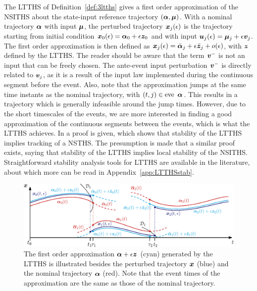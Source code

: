\documentclass[../DC2017114Bouma.tex]{subfiles}
\begin{document}
The LTTHS of Definition~\ref{def:3ltths} gives a first order approximation of the NSITHS about the state-input reference trajectory $(\boldsymbol{\alpha},\boldsymbol{\mu})$. With a nominal trajectory $\boldsymbol{\alpha}$ with input $\boldsymbol{\mu}$, the perturbed trajectory ${\boldsymbol{x}}_j(\epsilon)$ is the trajectory starting from initial condition ${\boldsymbol{x}}_0(\epsilon) = \boldsymbol{\alpha}_0 + \epsilon{\boldsymbol{z}}_0$ and with input ${\boldsymbol{u}}_j(\epsilon) = \boldsymbol{\mu}_j + \epsilon{\boldsymbol{v}}_j$. The first order approximation is then defined as ${\boldsymbol{x}}_j(\epsilon) = \bar{\boldsymbol{\alpha}}_j + \epsilon\bar{{\boldsymbol{z}}}_j + o(\epsilon)$, with ${\boldsymbol{z}}$ defined by the LTTHS. The reader should be aware that the term ${\boldsymbol{v}}^-$ is not an input that can be freely chosen. The ante-event input perturbation ${\boldsymbol{v}}^-$ is directly related to ${\boldsymbol{v}}_j$, as it is a result of the input law implemented during the continuous segment before the event. Also, note that the approximation jumps at the same time instants as the nominal trajectory, with $(t,j) \in \eve\ \alphab$. This results in a trajectory which is generally infeasible around the jump times. However, due to the short timescales of the events, we are more interested in finding a good approximation of the continuous segments between the events, which is what the LTTHS achieves. In \cite{Rijnen2017} a proof is given, which shows that stability of the LTTHS implies tracking of a NSTHS. The presumption is made that a similar proof exists, saying that stability of the LTTHS implies local stability of the NSITHS. Straightforward stability analysis tools for LTTHS are available in the literature, about which more can be read in Appendix~\ref{app:LTTHSstab}.
%
\begin{figure}[h]
\centering
\includegraphics[width=\textwidth]{refspreadapprox.eps}\caption{The first order approximation $\boldsymbol{\alpha} + \epsilon{\boldsymbol{z}}$ (cyan) generated by the LTTHS is illustrated besides the perturbed trajectory ${\boldsymbol{x}}$ (blue) and the nominal trajectory $\boldsymbol{\alpha}$ (red). Note that the event times of the approximation are the same as those of the nominal trajectory.} \label{fig:3refspreadapprox}
\end{figure}
\end{document}
